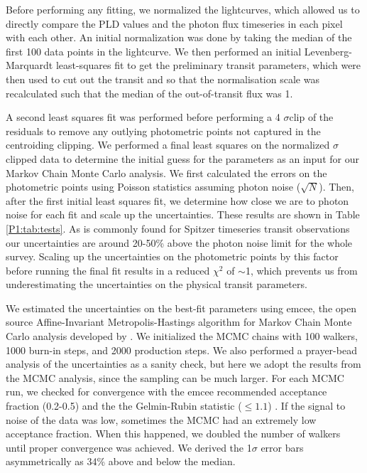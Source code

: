Before performing any fitting, we normalized the lightcurves, which allowed us to directly compare the PLD values and the photon flux timeseries in each pixel with each other. An initial normalization was done by taking the median of the first 100 data points in the lightcurve. We then performed an initial Levenberg-Marquardt least-squares fit to get the preliminary transit parameters, which were then used to cut out the transit and so that the normalisation scale was recalculated such that the median of the out-of-transit flux was 1.

A second least squares fit was performed before performing a 4 $\sigma$clip of the residuals to remove any outlying photometric points not captured in the centroiding clipping. We performed a final least squares on the normalized $\sigma$clipped data to determine the initial guess for the parameters as an input for our Markov Chain Monte Carlo analysis. We first calculated the errors on the photometric points using Poisson statistics assuming photon noise ($\sqrt{N}$). Then, after the first initial least squares fit, we determine how close we are to photon noise for each fit and scale up the uncertainties. These results are shown in Table \ref{P1:tab:tests}. As is commonly found for Spitzer timeseries transit observations our uncertainties are around 20-50\% above the photon noise limit for the whole survey. Scaling up the uncertainties on the photometric points by this factor before running the final fit results in a reduced $\chi^2$ of $\sim$1, which prevents us from underestimating the uncertainties on the physical transit parameters.

We estimated the uncertainties on the best-fit parameters using emcee, the open source Affine-Invariant Metropolis-Hastings algorithm for Markov Chain Monte Carlo analysis developed by \citet{Foreman-Mackey2013}. We initialized the MCMC chains with 100 walkers, 1000 burn-in steps, and 2000 production steps. We also performed a prayer-bead analysis of the uncertainties as a sanity check, but here we adopt the results from the MCMC analysis, since the sampling can be much larger. For each MCMC run, we checked for convergence with the emcee recommended acceptance fraction (0.2-0.5) and the the Gelmin-Rubin statistic ($\leq1.1$) \citep{Gelman1992}. If the signal to noise of the data was low, sometimes the MCMC had an extremely low acceptance fraction. When this happened, we doubled the number of walkers until proper convergence was achieved. We derived the 1$\sigma$ error bars asymmetrically as 34\% above and below the median.

